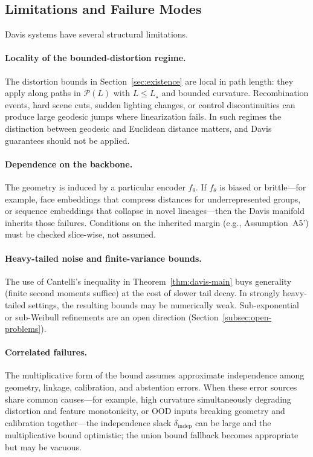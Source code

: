 \documentclass[11pt]{article}
\begin{document}
\subsection{Limitations and Failure Modes}

Davis systems have several structural limitations.

\paragraph{Locality of the bounded-distortion regime.}
The distortion bounds in Section~\ref{sec:existence} are local in path length: they apply along
paths in $\mathcal{P}(L)$ with $L \le L_\star$ and bounded curvature. Recombination events, hard
scene cuts, sudden lighting changes, or control discontinuities can produce large geodesic jumps
where linearization fails. In such regimes the distinction between geodesic and Euclidean distance
matters, and Davis guarantees should not be applied.

\paragraph{Dependence on the backbone.}
The geometry is induced by a particular encoder $f_\theta$. If $f_\theta$ is biased or brittle---for
example, face embeddings that compress distances for underrepresented groups, or sequence
embeddings that collapse in novel lineages---then the Davis manifold inherits those failures.
Conditions on the inherited margin (e.g., Assumption~A5') must be checked slice-wise, not assumed.

\paragraph{Heavy-tailed noise and finite-variance bounds.}
The use of Cantelli's inequality in Theorem~\ref{thm:davis-main} buys generality (finite second
moments suffice) at the cost of slower tail decay. In strongly heavy-tailed settings, the resulting
bounds may be numerically weak. Sub-exponential or sub-Weibull refinements are an open direction
(Section~\ref{subsec:open-problems}).

\paragraph{Correlated failures.}
The multiplicative form of the bound assumes approximate independence among
geometry, linkage, calibration, and abstention errors. When these error sources share common
causes---for example, high curvature simultaneously degrading distortion and feature monotonicity,
or OOD inputs breaking geometry and calibration together---the independence slack
$\delta_{\mathrm{indep}}$ can be large and the multiplicative bound optimistic; the union bound
fallback becomes appropriate but may be vacuous.
\end{document}
